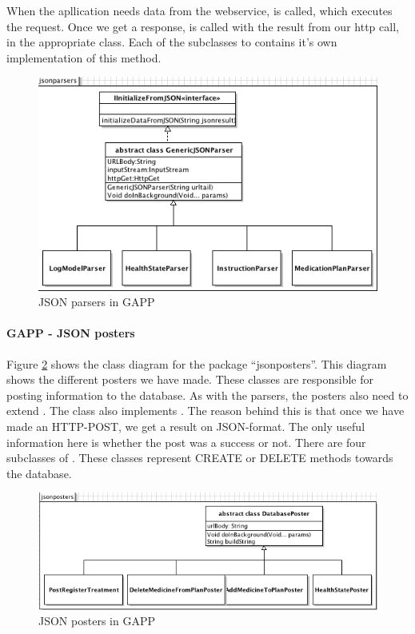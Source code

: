 When the apllication needs data from the webservice,  is called, which executes the request. 
Once we get a response,  is called with the result 
from our http call, in the appropriate class. Each of the subclasses to  contains it's own implementation of this method. 

\begin{figure}
	\centering
		\includegraphics[width = \linewidth]{Pictures/ArchPictures/jsonparsers.png}
	\caption{JSON parsers in GAPP}
	\label{fig:class-diagram-parent-jsonparsers}
\end{figure}


\paragraph{GAPP - JSON posters}
Figure \ref{fig:class-diagram-parent-jsonposters} shows the class diagram for the package ``jsonposters''.
This diagram shows the different posters we have made. These classes are responsible for posting information to the database. As with the parsers, the posters also need to extend .
The class  also implements . The reason behind this is that once we have made an HTTP-POST, we get a result on JSON-format. The only useful information here is whether
the post was a success or not. There are four subclasses of . These classes represent CREATE or DELETE methods towards the database. 

\begin{figure}
	\centering
		\includegraphics[width = \linewidth]{Pictures/ArchPictures/jsonposters.png}
	\caption{JSON posters in GAPP}
	\label{fig:class-diagram-parent-jsonposters}
\end{figure}



